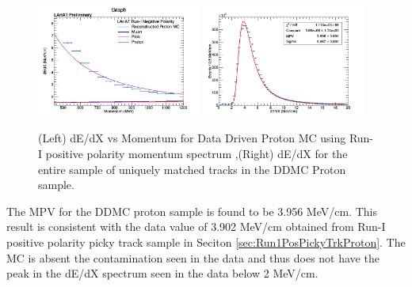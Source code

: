 \begin{figure}[htb]
\centering
\includegraphics[width=0.48\textwidth]{images/dEdXvsMomentumProtonMCVeryFineBin.png}
\includegraphics[width=0.48\textwidth]{images/dEdXDDMCProtonRunI.png}
\caption{(Left) dE/dX vs Momentum for Data Driven Proton MC using Run-I positive polarity momentum spectrum ,(Right) dE/dX for the entire sample of uniquely matched tracks in the DDMC Proton sample.}
\label{fig:DDMCProtonResults}
\end{figure}


The MPV for the DDMC proton sample is found to be 3.956 MeV/cm. This result is consistent with the data value of 3.902 MeV/cm obtained from Run-I positive polarity picky track sample in Seciton \ref{sec:Run1PosPickyTrkProton}. The MC is absent the contamination seen in the data and thus does not have the peak in the dE/dX spectrum seen in the data below 2 MeV/cm.
